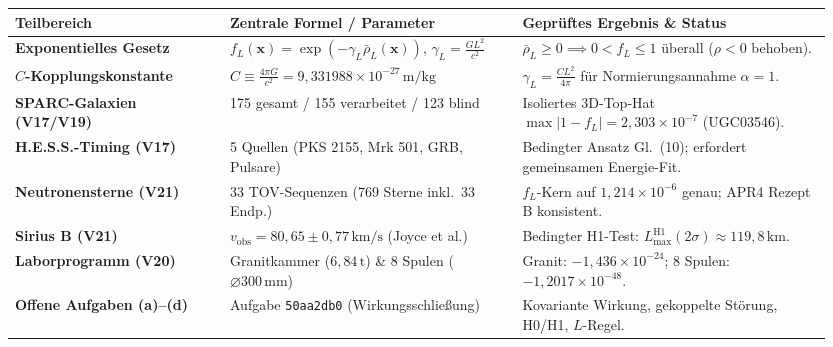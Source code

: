 \documentclass[10pt,a4paper]{article}
\begin{document}
\vspace{2mm}
\noindent{\color{navy}\rule{\linewidth}{0.8pt}}\par\vspace{1.5mm}
\begin{center}\vspace{-2pt}
{\scriptsize
\begin{tabular}{@{}>{\bfseries}p{0.25\linewidth}p{0.34\linewidth}p{0.36\linewidth}@{}}
\toprule
Teilbereich & Zentrale Formel / Parameter & Gepr\"uftes Ergebnis \& Status \\
\midrule
Exponentielles Gesetz & $f_L(\mathbf{x}) = \exp(-\gamma_L\bar{\rho}_L(\mathbf{x}))$, $\gamma_L = \frac{G L^2}{c^2}$ & $\bar{\rho}_L \ge 0 \implies 0 < f_L \le 1$ \"uberall ($\rho < 0$ behoben). \\
$C$-Kopplungskonstante & $C \equiv \frac{4\pi G}{c^2} = 9{,}331988\times 10^{-27}\,\text{m/kg}$ & $\gamma_L = \frac{C L^2}{4\pi}$ f\"ur Normierungsannahme $\alpha = 1$. \\
SPARC-Galaxien (V17/V19) & 175 gesamt / 155 verarbeitet / 123 blind & Isoliertes 3D-Top-Hat $\max|1-f_L|=2{,}303\times 10^{-7}$ (UGC03546). \\
H.E.S.S.-Timing (V17) & 5 Quellen (PKS 2155, Mrk 501, GRB, Pulsare) & Bedingter Ansatz Gl.\ (10); erfordert gemeinsamen Energie-Fit. \\
Neutronensterne (V21) & 33 TOV-Sequenzen (769 Sterne inkl.\ 33 Endp.) & $f_L$-Kern auf $1{,}214\times 10^{-6}$ genau; APR4 Rezept B konsistent. \\
Sirius B (V21) & $v_{\text{obs}} = 80{,}65\pm 0{,}77\,\text{km/s}$ (Joyce et al.) & Bedingter H1-Test: $L_{\max}^{\text{H1}}(2\sigma) \approx 119{,}8\,\text{km}$. \\
Laborprogramm (V20) & Granitkammer ($6{,}84\,\text{t}$) \& 8 Spulen ($\varnothing 300\,\text{mm}$) & Granit: $-1{,}436\times 10^{-24}$; 8 Spulen: $-1{,}2017\times 10^{-48}$. \\
Offene Aufgaben (a)--(d) & Aufgabe \texttt{50aa2db0} (Wirkungsschlie\ss ung) & Kovariante Wirkung, gekoppelte St\"orung, H0/H1, $L$-Regel. \\
\bottomrule
\end{tabular}}
\end{center}

\vfill
\noindent{\color{navy}\rule{\linewidth}{0.5pt}}\par
{}
\end{document}
